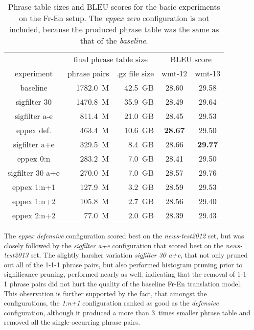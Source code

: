 \begin{table}[ht]
\centering
\begin{tabular}{ | c | r r | c c | }
\hline
 & \multicolumn{2}{|c|}{final phrase table size} & \multicolumn{2}{|c|}{BLEU score} \\
experiment & phrase pairs & .gz file size & wmt-12 & wmt-13 \\
\hline
\hline
baseline          & 1782.0~M & 42.5~GB & 28.60 & 29.58 \\
sigfilter 30      & 1470.8~M & 35.9~GB & 28.49 & 29.64 \\
sigfilter a-e     &  811.4~M & 21.0~GB & 28.45 & 29.53 \\
eppex def.        &  463.4~M & 10.6~GB & \textbf{28.67} & 29.50 \\
sigfilter a+e     &  329.5~M &  8.4~GB & 28.66 & \textbf{29.77} \\
eppex 0:n         &  283.2~M &  7.0~GB & 28.41 & 29.50 \\
sigfilter 30 a+e  &  270.0~M &  7.0~GB & 28.57 & 29.76 \\
eppex 1:n+1       &  127.9~M &  3.2~GB & 28.59 & 29.53 \\
eppex 1:n+2       &  105.8~M &  2.7~GB & 28.56 & 29.40 \\
eppex 2:n+2       &   77.0~M &  2.0~GB & 28.39 & 29.43 \\
\hline
\end{tabular}
\caption{\label{fr-en-pt-size-and-bleu}
Phrase table sizes and BLEU scores for the basic experiments on the Fr-En setup.
The \emph{eppex zero} configuration is not included, because the produced phrase table
was the same as that of the \emph{baseline}.}
\end{table}

The \emph{eppex defensive} configuration scored best on the \emph{news-test2012} set,
but was closely followed by the \emph{sigfilter a+e} configuration that scored best on
the \emph{news-test2013} set.
The slightly harsher variation \emph{sigfilter 30 a+e}, that not only pruned out
all of the 1-1-1 phrase pairs, but also performed histogram pruning prior to
significance pruning, performed nearly as well, indicating that the removal of
1-1-1 phrase pairs did not hurt the quality of the baseline Fr-En translation model.
This observation is further supported by the fact, that amongst the \eppex{} configurations,
the \emph{1:n+1} configuration ranked as good as the \emph{defensive} configuration, although it produced a more
than 3~times smaller phrase table and removed all the single-occurring phrase pairs.

